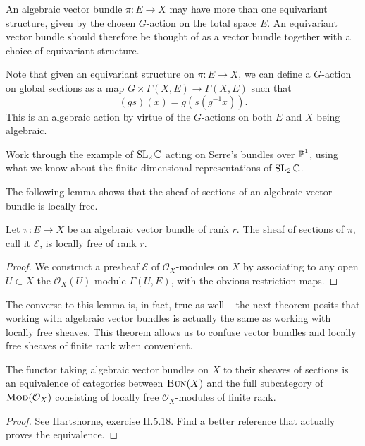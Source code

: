 \begin{remark}
    An algebraic vector bundle $\pi:E\to X$ may have more than one equivariant structure,
    given by the chosen $G$-action on the total space $E$. An equivariant vector bundle should
    therefore be thought of as a vector bundle together with a choice of equivariant structure.
    
    Note that given an equivariant structure on $\pi:E\to X$, we can define a $G$-action on
    global sections as a map $G\times\Gamma(X,E)\to\Gamma(X,E)$ such that
    \begin{equation}
        (gs)(x) = g\left( s(g^{-1}x) \right).
        \label{eq:eqActionSections}
    \end{equation}
    This is an algebraic action by virtue of the $G$-actions on both $E$ and $X$ being algebraic.
\end{remark}

\begin{example}
    Work through the example of $\operatorname{SL}_2\mathbb{C}$ acting on Serre's bundles over $\operatorname{\mathbb{P}}^1$,
    using what we know about the finite-dimensional representations of $\operatorname{SL}_2\mathbb{C}$.
\end{example}

The following lemma shows that the sheaf of sections of an algebraic vector bundle
is locally free.

\begin{lemma}
    Let $\pi:E\to X$ be an algebraic vector bundle of rank $r$. The sheaf of sections of $\pi$,
    call it $\mathcal{E}$, is locally free of rank $r$.
\end{lemma}
\begin{proof}
    We construct a presheaf $\mathcal{E}$ of $\mathcal{O}_X$-modules on $X$ by associating
    to any open $U\subset X$ the $\mathcal{O}_X(U)$-module $\Gamma(U,E)$, with the obvious
    restriction maps. 
\end{proof}

The converse to this lemma is, in fact, true as well -- the next theorem posits that working
with algebraic vector bundles is actually the same as working with locally free sheaves.
This theorem allows us to confuse vector bundles and locally free sheaves of finite rank when convenient.

\begin{theorem}
    The functor taking algebraic vector bundles on $X$ to their sheaves of sections is an
    equivalence of categories between $\textsc{Bun}(X)$ and the full subcategory of $\textsc{Mod}(\mathcal{O}_X)$
    consisting of locally free $\mathcal{O}_X$-modules of finite rank.
\end{theorem}
\begin{proof}
    See Hartshorne, exercise II.5.18. Find a better reference that actually proves the equivalence.
\end{proof}

